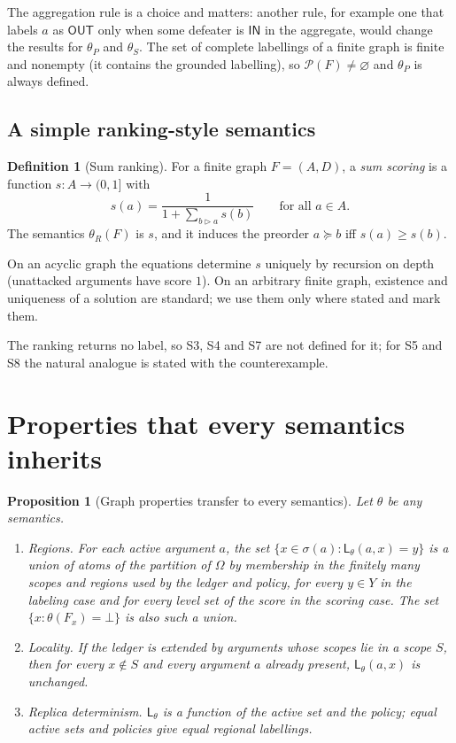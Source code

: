 \documentclass[11pt]{article}
\theoremstyle{plain}
\newtheorem{proposition}[theorem]{Proposition}
\theoremstyle{definition}
\newtheorem{definition}[theorem]{Definition}
\theoremstyle{remark}
\newcommand{\IN}{\textsf{IN}}
\newcommand{\OUT}{\textsf{OUT}}
\newcommand{\dfeat}{\rhd}
\newcommand{\Lab}{\mathsf{L}}
\begin{document}
The aggregation rule is a choice and matters: another rule, for example one that labels $a$ as $\OUT$ only when some defeater is $\IN$ in the aggregate, would change the results for $\theta_P$ and $\theta_S$. The set of complete labellings of a finite graph is finite and nonempty (it contains the grounded labelling), so $\mathcal P(F)\ne\varnothing$ and $\theta_P$ is always defined.

\subsection{A simple ranking-style semantics}

\begin{definition}[Sum ranking]\label{def:rank}
For a finite graph $F=(A,D)$, a \emph{sum scoring} is a function $s:A\to(0,1]$ with
\[
s(a)=\frac{1}{1+\sum_{b\dfeat a}s(b)}\qquad\text{for all }a\in A.
\]
The semantics $\theta_R(F)$ is $s$, and it induces the preorder $a\succeq b$ iff $s(a)\ge s(b)$.
\end{definition}

On an acyclic graph the equations determine $s$ uniquely by recursion on depth (unattacked arguments have score $1$). On an arbitrary finite graph, existence and uniqueness of a solution are standard; we use them only where stated and mark them.


The ranking returns no label, so S3, S4 and S7 are not defined for it; for S5 and S8 the natural analogue is stated with the counterexample.

\section{Properties that every semantics inherits}\label{sec:graphholds}

\begin{proposition}[Graph properties transfer to every semantics]\label{prop:graphprops}
Let $\theta$ be any semantics.
\begin{enumerate}[label=(\alph*)]
\item \emph{Regions.} For each active argument $a$, the set $\{x\in\sigma(a):\Lab_\theta(a,x)=y\}$ is a union of atoms of the partition of $\Omega$ by membership in the finitely many scopes and regions used by the ledger and policy, for every $y\in Y$ in the labeling case and for every level set of the score in the scoring case. The set $\{x:\theta(F_x)=\bot\}$ is also such a union.
\item \emph{Locality.} If the ledger is extended by arguments whose scopes lie in a scope $S$, then for every $x\notin S$ and every argument $a$ already present, $\Lab_\theta(a,x)$ is unchanged.
\item \emph{Replica determinism.} $\Lab_\theta$ is a function of the active set and the policy; equal active sets and policies give equal regional labellings.
\end{enumerate}
\end{proposition}
\end{document}
